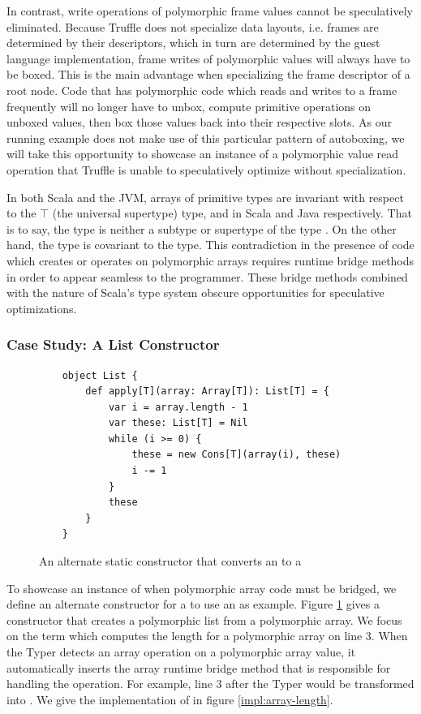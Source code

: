 In contrast, write operations of polymorphic frame values cannot be speculatively eliminated. 
Because Truffle does not specialize data layouts, i.e. frames are determined by their descriptors, which in turn are determined by the guest language implementation, frame writes of polymorphic values will always have to be boxed.
This is the main advantage when specializing the frame descriptor of a root node.
Code that has polymorphic code which reads and writes to a frame frequently will no longer have to unbox, compute primitive operations on unboxed values, then box those values back into their respective slots.
As our running example does not make use of this particular pattern of autoboxing, we will take this opportunity to showcase an instance of a polymorphic value read operation that Truffle is unable to speculatively optimize without specialization.

In both Scala and the JVM, arrays of primitive types are invariant with respect to the $\top$ (the universal supertype) type,  and  in Scala and Java respectively.
That is to say, the type  is neither a subtype or supertype of the type .
On the other hand, the type  is covariant to the  type.
This contradiction in the presence of code which creates or operates on polymorphic arrays requires runtime bridge methods in order to appear seamless to the programmer.
These bridge methods combined with the nature of Scala's type system obscure opportunities for speculative optimizations.

\subsubsection*{Case Study: A List Constructor}

\begin{figure}[!htb]
	\begin{verbatim}
	object List {
		def apply[T](array: Array[T]): List[T] = {
			var i = array.length - 1
			var these: List[T] = Nil
			while (i >= 0) {
				these = new Cons[T](array(i), these)
				i -= 1
			}
			these
		}	
	}
	\end{verbatim}
	\caption{An alternate static constructor that converts an  to a }
	\label{impl:list-alt-constructor}
\end{figure}

To showcase an instance of when polymorphic array code must be bridged, we define an alternate constructor for a  to use an as example.
Figure \ref{impl:list-alt-constructor} gives a constructor that creates a polymorphic list from a polymorphic array.
We focus on the term  which computes the length for a polymorphic array on line $3$.
When the Typer detects an array operation on a polymorphic array value, it automatically inserts the array runtime bridge method that is responsible for handling the operation.
For example, line $3$ after the Typer would be transformed into .
We give the implementation of  in figure \ref{impl:array-length}.

